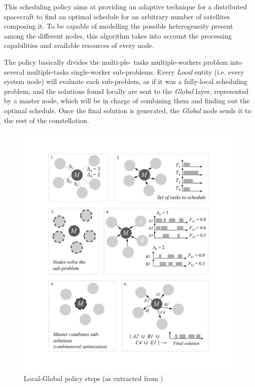 This scheduling policy aims at providing an adaptive technique for a distributed spacecraft to find an optimal schedule for an arbitrary number of satellites composing it. To be capable of modelling the possible heterogeneity present among the different nodes, this algorithm takes into account the processing capabilities and available resources of every node.

The policy basically divides the multi-ple\hskip0pt-\hskip0pt tasks multiple-workers problem into several multiple-tasks single-worker sub-problems. Every \emph{Local} entity (i.e. every system node) will evaluate each sub-problem, as if it was a fully-local scheduling problem, and the solutions found locally are sent to the \emph{Global} layer, represented by a master node, which will be in charge of combining them and finding out the optimal schedule. Once the final solution is generated, the \emph{Global} node sends it to the rest of the constellation.

\begin{figure}[h!]
\centering
\includegraphics[scale=0.3]{Figures/figure_policy_steps.pdf} 
\caption{Local-Global policy steps (as extracted from \cite{Araguz15})}
\label{fig_LGsteps}
\end{figure}

